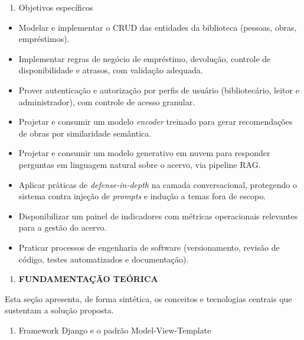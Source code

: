 \documentclass[
]{article}
\begin{document}
\begin{enumerate}
\def\labelenumi{\arabic{enumi}.}
\setcounter{enumi}{1}
\item
  \protect{}\label{_Toc230227808}{}Objetivos específicos
\end{enumerate}

\begin{itemize}
\item
  Modelar e implementar o CRUD das entidades da biblioteca (pessoas,
  obras, empréstimos).
\item
  Implementar regras de negócio de empréstimo, devolução, controle de
  disponibilidade e atrasos, com validação adequada.
\item
  Prover autenticação e autorização por perfis de usuário
  (bibliotecário, leitor e administrador), com controle de acesso
  granular.
\item
  Projetar e consumir um modelo \emph{encoder} treinado para gerar
  recomendações de obras por similaridade semântica.
\item
  Projetar e consumir um modelo generativo em nuvem para responder
  perguntas em linguagem natural sobre o acervo, via pipeline RAG.
\item
  Aplicar práticas de \emph{defense-in-depth} na camada conversacional,
  protegendo o sistema contra injeção de \emph{prompts} e indução a
  temas fora de escopo.
\item
  Disponibilizar um painel de indicadores com métricas operacionais
  relevantes para a gestão do acervo.
\item
  Praticar processos de engenharia de software (versionamento, revisão
  de código, testes automatizados e documentação).
\end{itemize}

\begin{enumerate}
\def\labelenumi{\arabic{enumi}.}
\setcounter{enumi}{3}
\item
  \protect{}\label{_Toc230227809}{}\textbf{FUNDAMENTAÇÃO
  TEÓRICA}
\end{enumerate}

Esta seção apresenta, de forma sintética, os conceitos e tecnologias
centrais que sustentam a solução proposta.

\begin{enumerate}
\def\labelenumi{\arabic{enumi}.}
\item
  \protect{}\label{_Toc230227810}{}Framework Django e o
  padrão Model-View-Template
\end{enumerate}
\end{document}
